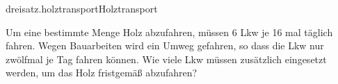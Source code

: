 \begin{exercise}{dreisatz.holztransport}{Holztransport}
  \ifproblem\problem\par
    Um eine bestimmte Menge Holz abzufahren, müssen 6 Lkw je 16 mal täglich fahren.
    Wegen Bauarbeiten wird ein Umweg gefahren, so dass die Lkw nur zwölfmal je Tag
    fahren können. Wie viele Lkw müssen zusätzlich eingesetzt werden, um das
    Holz fristgemäß abzufahren?
  \fi
\end{exercise}
